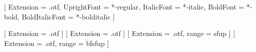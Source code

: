 \usepackage{unicode-math}




\setmainfont{texgyrepagella}[
  Extension = {.otf}, %
  UprightFont    = *-regular,
  ItalicFont     = *-italic,
  BoldFont       = *-bold,
  BoldItalicFont = *-bolditalic
  ]

[
  Extension = {.otf} %
]
[
  Extension = {.otf} %
]
[
  Extension = {.otf}, %
  range = sfup
]
[
  Extension = {.otf}, %
  range = bfsfup
]

